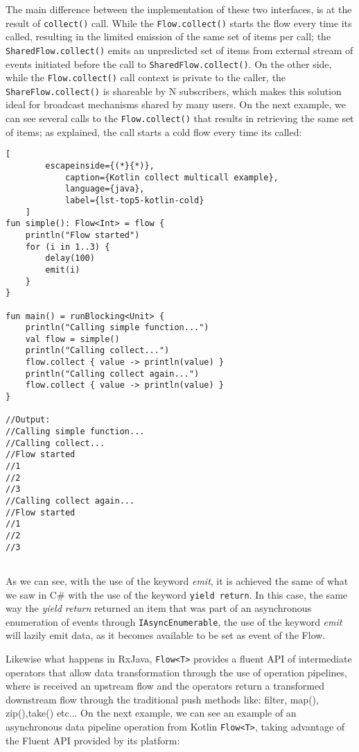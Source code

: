 The main difference between the implementation of these two interfaces, is at the result of \texttt{collect()} call. 
While the \texttt{Flow.collect()} starts the flow every time its called, resulting in the limited emission of the same set of items per call; the \texttt{SharedFlow.collect()} emits an unpredicted set of items from external stream of events initiated before the call to \texttt{SharedFlow.collect()}.
On the other side, while the \texttt{Flow.collect()} call context is private to the caller, the \texttt{ShareFlow.collect()} is shareable by N subscribers, which makes this solution ideal for broadcast mechanisms shared by many users.
On the next example, we can see several calls to the \texttt{Flow.collect()} that results in retrieving the same set of items; as explained, the call starts a cold flow every time its called:

\begin{center}
	\lstset{basicstyle=\scriptsize\ttfamily,frame=bottomline}
	\begin{lstlisting}[
		escapeinside={(*}{*)},
			caption={Kotlin collect multicall example},
			language={java},
			label={lst-top5-kotlin-cold}
	]
fun simple(): Flow<Int> = flow { 
	println("Flow started")
	for (i in 1..3) {
		delay(100)
		emit(i)
	}
}

fun main() = runBlocking<Unit> {
	println("Calling simple function...")
	val flow = simple()
	println("Calling collect...")
	flow.collect { value -> println(value) } 
	println("Calling collect again...")
	flow.collect { value -> println(value) } 
}

//Output:
//Calling simple function...
//Calling collect...
//Flow started
//1
//2
//3
//Calling collect again...
//Flow started
//1
//2
//3
	
	\end{lstlisting}
\end{center}

As we can see, with the use of the keyword \textit{emit}, it is achieved the same of what we saw in C\# with the use of the keyword \texttt{yield return}.
In this case, the same way the \textit{yield return} returned an item that was part of an asynchronous enumeration of events through \texttt{IAsyncEnumerable}, the use of the keyword \textit{emit} will lazily emit data, as it becomes available to be set as event of the Flow.

Likewise what happens in RxJava, \texttt{Flow<T>} provides a fluent API of intermediate operators that allow data transformation through the use of operation pipelines, where is received an upstream  flow and the operators return a transformed downstream flow through the traditional push methods like: filter, map(), zip(),take() etc... 
On the next example, we can see an example of an asynchronous data pipeline operation from Kotlin \texttt{Flow<T>}, taking advantage of the Fluent API provided by its platform:

